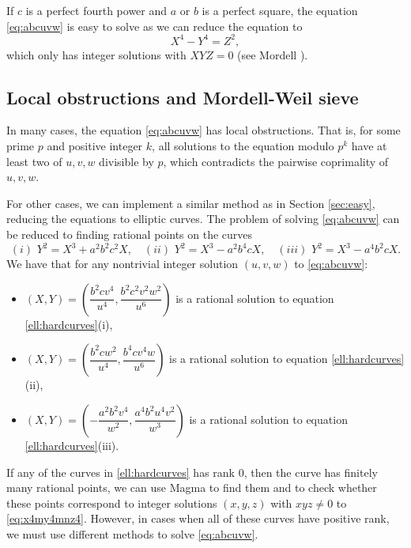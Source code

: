 \documentclass[a4paper,12pt,english,reqno]{amsart}
\begin{document}
If $c$ is a perfect fourth power and $a$ or $b$ is a perfect square, the equation \eqref{eq:abcuvw} is easy to solve as we can reduce the equation to 
\begin{equation}\label{eq:mordell}
X^4-Y^4=Z^2,
\end{equation}
which only has integer solutions with $XYZ=0$ (see Mordell \cite[Theorem~2, page 17]{Mordell}). 

\subsection{Local obstructions and Mordell-Weil sieve}\label{sec:localsieve}
In many cases, the equation \eqref{eq:abcuvw} has local obstructions. That is, for some prime $p$ and positive integer $k$, all solutions to the equation modulo $p^k$ have at least two of $u,v,w$ divisible by $p$, which contradicts the pairwise coprimality of $u,v,w$. 

For other cases, we can implement a similar method as in Section \ref{sec:easy}, reducing the equations to elliptic curves. 
The problem of solving \eqref{eq:abcuvw} can be reduced to finding rational points on the curves
\begin{equation}\label{ell:hardcurves}
(i) \,\, Y^2=X^3+a^2b^2c^2X, \quad (ii) \,\, Y^2=X^3-a^2b^4cX, \quad (iii) \,\, Y^2=X^3-a^4b^2cX.
\end{equation}
We have that for any nontrivial integer solution $(u,v,w)$ to \eqref{eq:abcuvw}:
\begin{itemize} 
	\item[] $(X,Y)=\left(\dfrac{b^2cv^4}{u^4},\dfrac{b^2c^2v^2w^2}{u^6}\right)$ is a rational solution to equation \eqref{ell:hardcurves}(i),%
	\item[] $(X,Y)=\left(\dfrac{b^2cw^2}{u^4},\dfrac{b^4cv^4w}{u^6}\right)$ is a rational solution to equation \eqref{ell:hardcurves}(ii),%
	\item[] $(X,Y)=\left(- \dfrac{a^2b^2v^4}{w^2},\dfrac{a^4b^2u^4v^2}{w^3}\right)$ is a rational solution to equation \eqref{ell:hardcurves}(iii).%
\end{itemize}
If any of the curves in \eqref{ell:hardcurves} has rank $0$, then the curve has finitely many rational points, we can use Magma \cite{MR1484478} to find them and to check whether these points correspond to integer solutions $(x,y,z)$ with $xyz \neq 0$ to \eqref{eq:x4my4mnz4}. However, in cases when all of these curves have positive rank, we must use different methods to solve \eqref{eq:abcuvw}.
\end{document}
